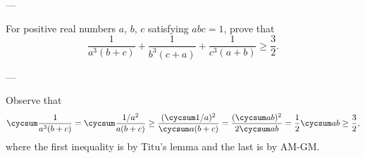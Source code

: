 
---

For positive real numbers $a$, $b$, $c$ satisfying $abc=1$, prove that \[\frac1{a^3(b+c)}+\frac1{b^3(c+a)}+\frac1{c^3(a+b)}\ge\frac32.\]

---

Observe that \[\cycsum\frac1{a^3(b+c)}=\cycsum\frac{1/a^2}{a(b+c)}\ge\frac{(\cycsum 1/a)^2}{\cycsum a(b+c)}=\frac{(\cycsum ab)^2}{2\cycsum ab}=\frac12\cycsum ab\ge\frac32,\]
where the first inequality is by Titu's lemma and the last is by AM-GM.
